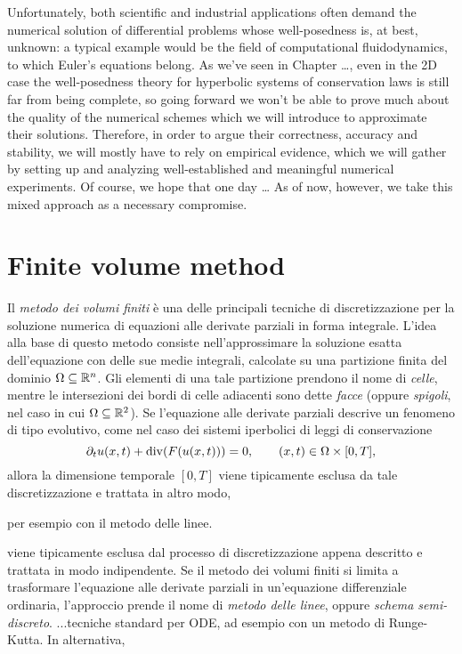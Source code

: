 Unfortunately, both scientific and industrial applications often demand
the numerical solution of differential problems whose well-posedness is,
at best, unknown: a typical example would be the field of computational
fluidodynamics, to which Euler's equations belong.
As we've seen in Chapter \dots,
even in the 2D case the well-posedness theory for hyperbolic systems
of conservation laws is still far from being complete,
so going forward
we won't be able to prove much about the quality of the numerical
schemes which we will introduce to approximate their solutions.
Therefore, in order to argue their correctness, accuracy and
stability, we will mostly have to rely on empirical evidence,
which we will gather by setting up and analyzing well-established
and meaningful numerical experiments.
Of course, we hope that one day \dots
As of now, however, we take this mixed approach as a necessary compromise.

\section{Finite volume method}














\clearpage

Il \emph{metodo dei volumi finiti} è una delle principali
tecniche di discretizzazione per la soluzione numerica di equazioni
alle derivate parziali in forma integrale.
L'idea alla base di questo metodo consiste nell'approssimare
la soluzione esatta dell'equazione con delle sue medie integrali,
calcolate su una partizione finita del dominio $\Omega \subseteq \mathbb{R}^n$.
Gli elementi di una tale partizione prendono il nome di \emph{celle},
mentre le intersezioni dei bordi di celle adiacenti sono dette \emph{facce}
(oppure \emph{spigoli}, nel caso in cui $\Omega \subseteq \mathbb{R}^2$).
Se l'equazione alle derivate parziali descrive un fenomeno di tipo
evolutivo, come nel caso dei sistemi iperbolici di leggi
di conservazione
\[
\partial_t u(x,t) + \operatorname{div}(F(u(x,t))) = 0,
\qquad (x,t) \in \Omega \times [0,T],
\]
allora la dimensione temporale $[0,T]$ viene tipicamente esclusa
da tale discretizzazione e trattata in altro modo,

per esempio con il metodo delle linee.

viene tipicamente esclusa dal processo di discretizzazione appena descritto
e trattata in modo indipendente.
Se il metodo dei volumi finiti si limita a trasformare
l'equazione alle derivate parziali in un'equazione differenziale
ordinaria, l'approccio prende il nome di \emph{metodo delle linee},
oppure \emph{schema semi-discreto}.
...tecniche standard per ODE, ad esempio con un metodo di Runge-Kutta.
In alternativa, 


